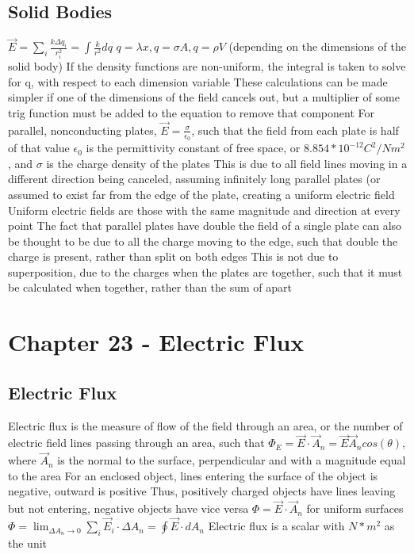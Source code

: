 \documentclass[11 pt, twoside]{article}
\newenvironment{outline*}
{
	\begin{outline}[enumerate]
	}
	{\end{outline}
}
\begin{document}
\subsection{Solid Bodies}
\begin{outline*}
\1 $\vec{E} = \sum_i \frac{k\Delta q_i}{r_i^2} = \int \frac{k}{r^2}dq$
\2 $q = \lambda x, q = \sigma A, q = \rho V$ (depending on the dimensions of the solid body)
\2 If the density functions are non-uniform, the integral is taken to solve for q, with respect to each dimension variable 
\2 These calculations can be made simpler if one of the dimensions of the field cancels out, but a multiplier of some trig function must be added to the equation to remove that component
\1 For parallel, nonconducting plates, $\vec{E} = \frac{\sigma}{\epsilon_0}$, such that the field from each plate is half of that value
\2 $\epsilon_0$ is the permittivity constant of free space, or $8.854 * 10^{-12} C^2/Nm^2$, and $\sigma$ is the charge density of the plates
\2 This is due to all field lines moving in a different direction being canceled, assuming infinitely long parallel plates (or assumed to exist far from the edge of the plate, creating a uniform electric field
\2 Uniform electric fields are those with the same magnitude and direction at every point
\2 The fact that parallel plates have double the field of a single plate can also be thought to be due to all the charge moving to the edge, such that double the charge is present, rather than split on both edges
\3 This is not due to superposition, due to the charges when the plates are together, such that it must be calculated when together, rather than the sum of apart
\end{outline*}

\section{Chapter 23 - Electric Flux}
\subsection{Electric Flux}
\begin{outline*}
\1 Electric flux is the measure of flow of the field through an area, or the  number of electric field lines passing through an area, such that $\Phi_E = \vec{E} \cdot \vec{A}_n = \vec{E}\vec{A}_ncos(\theta)$, where $\vec{A}_n$ is the normal to the surface, perpendicular and with a magnitude equal to the area
\2 For an enclosed object, lines entering the surface of the object is negative, outward is positive
\2 Thus, positively charged objects have lines leaving but not entering, negative objects have vice versa 
\1 $\Phi = \vec{E} \cdot \vec{A}_n$ for uniform surfaces
\2 $\Phi = \lim_{\Delta A_n \to 0} \sum_i \vec{E}_i \cdot \Delta A_n = \oint \vec{E} \cdot dA_n$
\2 Electric flux is a scalar with $N*m^2$ as the unit
\end{outline*}
\end{document}
